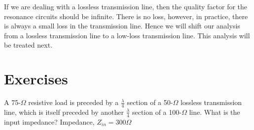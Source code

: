 If we are dealing with a lossless transmission line, then the quality factor for the resonance circuits should be infinite. There is no loss, however, in practice, there is always a small loss in the transmission line. Hence we will shift our analysis from a lossless transmission line to a low-loss transmission line. This analysis will be treated next.

\section*{Exercises}
\begin{ExerciseList}
\Exercise[label={ex101}]
A 75-$\varOmega$ resistive load is preceded by a $\frac{\lambda}{4}$ section of a 50-$\varOmega$ lossless transmission line, which is itself preceded by another $\frac{\lambda}{4}$ section of a 100-$\varOmega$ line. What is the input impedance?
\Answer
Impedance, $Z_{in} = 300\varOmega$
\end{ExerciseList}
